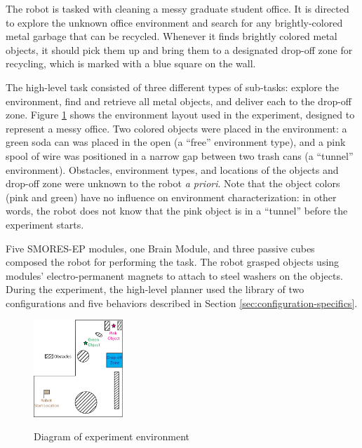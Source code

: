 \documentclass[conference]{IEEEtran}
\begin{document}
The robot is tasked with cleaning a messy graduate student office.  It is directed to explore the unknown office environment and search for any brightly-colored metal garbage that can be recycled.  Whenever it finds brightly colored metal objects, it should pick them up and bring them to a designated drop-off zone for recycling, which is marked with a blue square on the wall.

The high-level task consisted of three different types of sub-tasks: explore the environment, find and retrieve all metal objects, and deliver each to the drop-off zone. Figure \ref{fig:map} shows the environment layout used in the experiment, designed to represent a messy office. Two colored objects were placed in the environment: a green soda can was placed in the open (a ``free'' environment type), and a pink spool of wire was positioned in a narrow gap between two trash cans (a ``tunnel'' environment). Obstacles, environment types, and locations of the objects and drop-off zone were unknown to the robot \textit{a priori}.  Note that the object colors (pink and green) have no influence on environment characterization: in other words, the robot does not know that the pink object is in a ``tunnel''  before the experiment starts.
 

Five SMORES-EP modules, one Brain Module, and three passive cubes composed the robot for performing the task. The robot grasped objects using modules' electro-permanent magnets to attach to steel washers on the objects.
During the experiment, the high-level planner used the library of two configurations and five behaviors described in Section \ref{sec:configuration-specifics}.

\begin{figure}
\begin{center}
\includegraphics[width=0.3\textwidth]{images/RSSMap.png}
\caption{Diagram of experiment environment}
\vspace{-2em}
\label{fig:map}
\end{center}
\end{figure}
\end{document}
